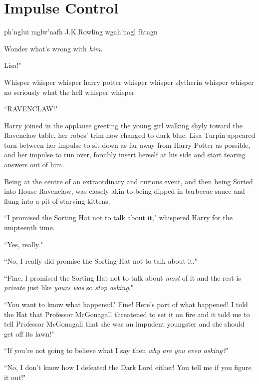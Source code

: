 \chapter{Impulse Control}

\begin{chapterOpeningAuthorNote}
ph'nglui mglw'nafh J.\?K.\?Rowling wgah'nagl fhtagn
\end{chapterOpeningAuthorNote}
\begin{chapterOpeningQuote}
Wonder what's wrong with \emph{him}.
\end{chapterOpeningQuote}

 Lisa!"

\hplettrineextrapara
Whisper whisper whisper harry potter whisper whisper slytherin whisper whisper no seriously what the hell whisper whisper

``RAVENCLAW!"

Harry joined in the applause greeting the young girl walking shyly toward the Ravenclaw table, her robes' trim now changed to dark blue. Lisa Turpin appeared torn between her impulse to sit down as far away from Harry Potter as possible, and her impulse to run over, forcibly insert herself at his side and start tearing answers out of him.

Being at the centre of an extraordinary and curious event, and then being Sorted into House Ravenclaw, was closely akin to being dipped in barbecue sauce and flung into a pit of starving kittens.

``I promised the Sorting Hat not to talk about it," whispered Harry for the umpteenth time.

``Yes, really."

``No, I really did promise the Sorting Hat not to talk about it."

``Fine, I promised the Sorting Hat not to talk about \emph{most} of it and the rest is \emph{private} just like \emph{yours was} so \emph{stop asking}."

``You want to know what happened? Fine! Here's part of what happened! I told the Hat that Professor McGonagall threatened to set it on fire and it told me to tell Professor McGonagall that she was an impudent youngster and she should get off its lawn!"

``If you're not going to believe what I say then \emph{why are you even asking?}"

``No, I don't know how I defeated the Dark Lord either! You tell me if you figure it out!"

